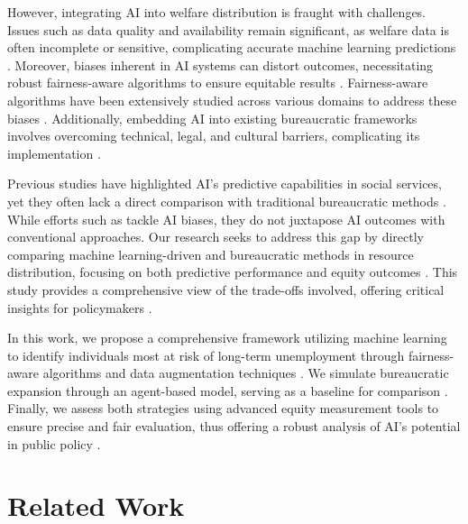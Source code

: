 \documentclass[11pt]{article}
\begin{document}
However, integrating AI into welfare distribution is fraught with challenges. Issues such as data quality and availability remain significant, as welfare data is often incomplete or sensitive, complicating accurate machine learning predictions \citep{predicting2023,forecasting2025}. Moreover, biases inherent in AI systems can distort outcomes, necessitating robust fairness-aware algorithms to ensure equitable results \citep{are2022}. Fairness-aware algorithms have been extensively studied across various domains to address these biases \citep{fairnessaware2024,fairnessaware2022,towards2023,the2018,on2024}. Additionally, embedding AI into existing bureaucratic frameworks involves overcoming technical, legal, and cultural barriers, complicating its implementation \citep{navigating2025,resource2025,bridging2024}.

Previous studies have highlighted AI's predictive capabilities in social services, yet they often lack a direct comparison with traditional bureaucratic methods \citep{a2024}. While efforts such as  tackle AI biases, they do not juxtapose AI outcomes with conventional approaches. Our research seeks to address this gap by directly comparing machine learning-driven and bureaucratic methods in resource distribution, focusing on both predictive performance and equity outcomes \citep{participation2003,supervised2024}. This study provides a comprehensive view of the trade-offs involved, offering critical insights for policymakers \citep{popularizing2023,research2024,statistical2024}.

In this work, we propose a comprehensive framework utilizing machine learning to identify individuals most at risk of long-term unemployment through fairness-aware algorithms and data augmentation techniques \citep{welfare2023,express2025,on2024}. We simulate bureaucratic expansion through an agent-based model, serving as a baseline for comparison \citep{agentbased2025,an2014}. Finally, we assess both strategies using advanced equity measurement tools to ensure precise and fair evaluation, thus offering a robust analysis of AI's potential in public policy \citep{bridging2025,simplified2016,lyapunovguided2024,f2ul2024,supervised2024}.

\section{Related Work}
\end{document}

